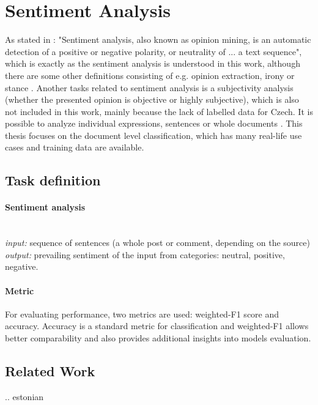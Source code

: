 \section{Sentiment Analysis}
\label{chap:sent}
As stated in \citep{Veselovska}: "Sentiment analysis, also known as opinion mining, is an automatic detection of a positive or negative polarity, or neutrality of ... a text sequence", which is exactly as the sentiment analysis is understood in this work, although there are some other definitions consisting of e.g. opinion extraction, irony or stance \citep{Montoyo2012}. Another tasks related to sentiment analysis is a subjectivity analysis (whether the presented opinion is objective or highly subjective), which is also not included in this work, mainly because the lack of labelled data for Czech. It is possible to analyze individual expressions, sentences or whole documents \citep{Veselovska}. This thesis focuses on the document level classification, which has many real-life use cases and training data are available.
\subsection{Task definition}
\paragraph{Sentiment analysis} \mbox{}\\
\textit{input:} sequence of sentences (a whole post or comment, depending on the source) \\
\textit{output:} prevailing sentiment of the input from categories: neutral, positive, negative.
\par

\paragraph{Metric} For evaluating performance, two metrics are used: weighted-F1 score and accuracy. Accuracy is a standard metric for classification and weighted-F1 allows better comparability and also provides additional insights into models evaluation.

\subsection{Related Work}
\citep{Cano2019}
\citep{Kittask2020} .. estonian

\citep{Hercig2018}
\citep{Li}

